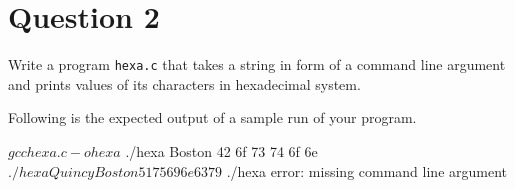 
\section*{Question 2}

Write a program \texttt{hexa.c} that takes a string in form of a command line argument and prints values of its characters in hexadecimal system.

Following is the expected output of a sample run of your program.

\begin{terminal}
$ gcc hexa.c -o hexa
$ ./hexa Boston
42 6f 73 74 6f 6e
$ ./hexa Quincy Boston
51 75 69 6e 63 79
$ ./hexa
error: missing command line argument
\end{terminal}
